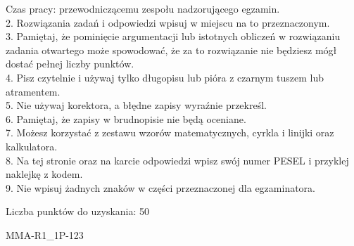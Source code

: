 \documentclass[10pt]{article}
\begin{document}
Czas pracy: przewodniczącemu zespołu nadzorującego egzamin.\\
2. Rozwiązania zadań i odpowiedzi wpisuj w miejscu na to przeznaczonym.\\
3. Pamiętaj, że pominięcie argumentacji lub istotnych obliczeń w rozwiązaniu zadania otwartego może spowodować, że za to rozwiązanie nie będziesz mógł dostać pełnej liczby punktów.\\
4. Pisz czytelnie i używaj tylko długopisu lub pióra z czarnym tuszem lub atramentem.\\
5. Nie używaj korektora, a błędne zapisy wyraźnie przekreśl.\\
6. Pamiętaj, że zapisy w brudnopisie nie będą oceniane.\\
7. Możesz korzystać z zestawu wzorów matematycznych, cyrkla i linijki oraz kalkulatora.\\
8. Na tej stronie oraz na karcie odpowiedzi wpisz swój numer PESEL i przyklej naklejkę z kodem.\\
9. Nie wpisuj żadnych znaków w części przeznaczonej dla egzaminatora.

Liczba punktów do uzyskania: 50

MMA-R1\_1P-123
\end{document}
